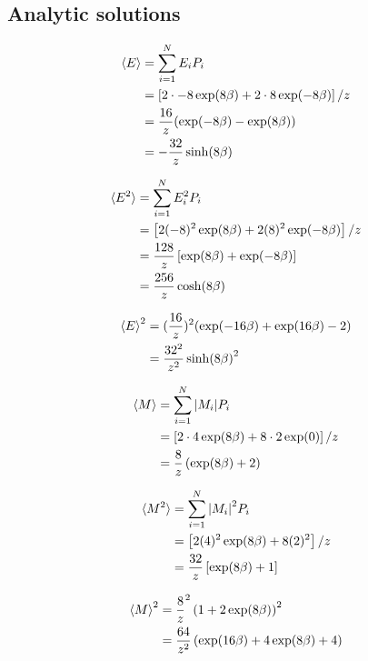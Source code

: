 
\begin{appendices}

\section{Analytic solutions}
\label{app:analytic}


\begin{align}
  \braket{E} &= \sum_{i=1}^{N} E_i P_i \\
             &= \left[2 \cdot -8 \exp(8\beta) + 2\cdot 8 \exp(-8\beta)\right] / z \\
             &= \frac{16}{z} ( \exp(-8\beta) - \exp(8\beta)) \\
             &= -\frac{32}{z} \sinh(8\beta)
\end{align}


\begin{align}
  \braket{E^2} &= \sum_{i=1}^{N} E_i^2 P_i \\
                &= \left[ 2 (-8)^2\exp(8\beta) + 2 (8)^2\exp(-8\beta) \right] /z \\
                &= \frac{128}{z}\left[ \exp(8 \beta) + \exp(-8\beta)\right] \\
                &= \frac{256}{z} \cosh(8\beta)
\end{align}

\begin{align}
  \braket{E}^2 &= (\frac{16}{z})^2 ( \exp(-16\beta) + \exp(16\beta) - 2) \\
               &= \frac{32^2}{z^2} \sinh(8\beta)^2
\end{align}

\begin{align}
  \braket{M} &= \sum_{i=1}^{N} \abs{M_i} P_i \\
             &= \left[2\cdot 4 \exp(8\beta ) + 8 \cdot 2 \exp(0)\right] / z \\
             &= \frac{8}{z} \left( \exp(8\beta) + 2\right)
\end{align}


\begin{align}
  \braket{M^2} &= \sum_{i=1}^{N} \abs{M_i}^2 P_i \\
               &= \left[2 (4)^2 \exp(8\beta) + 8 (2)^2\right] / z \\
               &= \frac{32}{z} \left[ \exp(8\beta) + 1 \right]
\end{align}

\begin{align}
  \braket{M}^2 &= \frac{8}{z}^2 \left( 1 + 2\exp(8\beta) \right)^2 \\
               &= \frac{64}{z^2} \left( \exp(16\beta) + 4\exp(8\beta) +  4\right)
\end{align}


\end{appendices}
